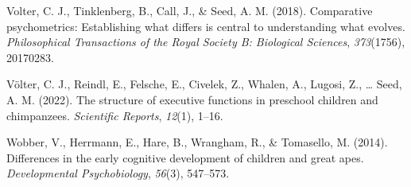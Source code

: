 \documentclass[
  man,floatsintext]{apa6}
\newlength{\cslhangindent}
\newlength{\cslentryspacingunit} %
\newenvironment{CSLReferences}[2] %
 {%
  \setlength{\parindent}{0pt}
  \ifodd #1
  \let\oldpar\par
  \def\par{\hangindent=\cslhangindent\oldpar}
  \fi
  \setlength{\parskip}{#2\cslentryspacingunit}
 }%
 {}
\begin{document}
\begin{CSLReferences}{1}{0}
\leavevmode{}%
Volter, C. J., Tinklenberg, B., Call, J., \& Seed, A. M. (2018). Comparative psychometrics: Establishing what differs is central to understanding what evolves. \emph{Philosophical Transactions of the Royal Society B: Biological Sciences}, \emph{373}(1756), 20170283.

\leavevmode{}%
Völter, C. J., Reindl, E., Felsche, E., Civelek, Z., Whalen, A., Lugosi, Z., \ldots{} Seed, A. M. (2022). The structure of executive functions in preschool children and chimpanzees. \emph{Scientific Reports}, \emph{12}(1), 1--16.

\leavevmode{}%
Wobber, V., Herrmann, E., Hare, B., Wrangham, R., \& Tomasello, M. (2014). Differences in the early cognitive development of children and great apes. \emph{Developmental Psychobiology}, \emph{56}(3), 547--573.

\end{CSLReferences}

\endgroup
\end{document}
